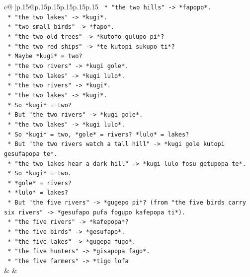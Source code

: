\documentclass{article}
\begin{document}
{\begin{supertabular}{c@{$\;$}|p{.15\linewidth}@{}p{.15\linewidth}p{.15\linewidth}p{.15\linewidth}p{.15\linewidth}p{.15\linewidth}}
{{{\texttt{                *   "the two hills" {-}> *fapopo*.} \\
\texttt{                *   "the two lakes" {-}> *kugi*.} \\
\texttt{                *   "two small birds" {-}> *fapo*.} \\
\texttt{                *   "the two old trees" {-}> *kutofo gulupo pi*?} \\
\texttt{                *   "the two red ships" {-}> *te kutopi sukupo ti*?} \\
\texttt{                *   Maybe *kugi* = two?} \\
\texttt{                *   "the two rivers" {-}> *kugi gole*.} \\
\texttt{                *   "the two lakes" {-}> *kugi lulo*.} \\
\texttt{                *   "the two rivers" {-}> *kugi*.} \\
\texttt{                *   "the two lakes" {-}> *kugi*.} \\
\texttt{                *   So *kugi* = two?} \\
\texttt{                *   But "the two rivers" {-}> *kugi gole*.} \\
\texttt{                *   "the two lakes" {-}> *kugi lulo*.} \\
\texttt{                *   So *kugi* = two, *gole* = rivers? *lulo* = lakes?} \\
\texttt{                *   But "the two rivers watch a tall hill" {-}> *kugi gole kutopi gesufapopa te*.} \\
\texttt{                *   "the two lakes hear a dark hill" {-}> *kugi lulo fosu getupopa te*.} \\
\texttt{                *   So *kugi* = two.} \\
\texttt{                *   *gole* = rivers?} \\
\texttt{                *   *lulo* = lakes?} \\
\texttt{                *   But "the five rivers" {-}> *gugepo pi*? (from "the five birds carry six rivers" {-}> *gesufapo pufa fogupo kafepopa ti*).} \\
\texttt{                *   "the five rivers" {-}> *kafepopa*?} \\
\texttt{                *   "the five birds" {-}> *gesufapo*.} \\
\texttt{                *   "the five lakes" {-}> *gugepa fugo*.} \\
\texttt{                *   "the five hunters" {-}> *gisapopa fago*.} \\
\texttt{                *   "the five farmers" {-}> *tigo lofa} \\
            }
        }
    }
    & & \\ \\


\end{supertabular}}
\end{document}
